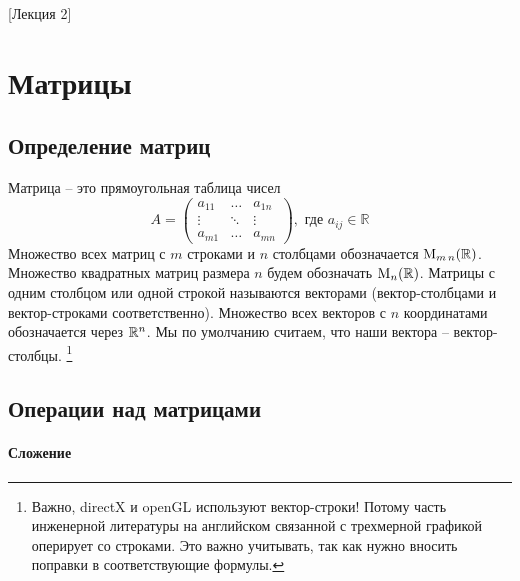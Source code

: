 [Лекция 2]


\newpage

\section{Матрицы}

\subsection{Определение матриц}

Матрица -- это прямоугольная таблица чисел
\[
A=
\begin{pmatrix}
a_{11}&\ldots& a_{1n}\\
\vdots&\ddots&\vdots\\
a_{m1}& \ldots &a_{mn}
\end{pmatrix},\text{ где } a_{ij}\in \mathbb R
\]
Множество всех матриц с $m$ строками и $n$ столбцами обозначается $\operatorname{M}_{m\,n}(\mathbb R)$.
Множество квадратных матриц размера $n$ будем обозначать $\operatorname{M}_{n}(\mathbb R)$.
Матрицы с одним столбцом или одной строкой называются векторами (вектор-столбцами и вектор-строками соответственно).
Множество всех векторов с $n$ координатами обозначается через $\mathbb R^{n}$.
Мы по умолчанию считаем, что наши вектора -- вектор-столбцы.%
\footnote{Важно, directX и openGL используют вектор-строки!
Потому часть инженерной литературы на английском связанной с трехмерной графикой оперирует со строками.
Это важно учитывать, так как нужно вносить поправки в соответствующие формулы.}

\subsection{Операции над матрицами}

\paragraph{Сложение}

